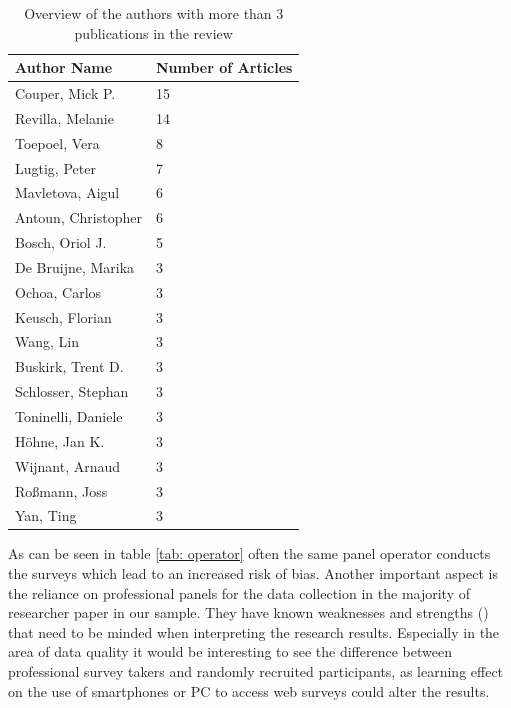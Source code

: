 \begin{table}
	\centering
	\begin{tabular}{ll}
		\toprule
		Author Name & Number of Articles \\
		\midrule
		Couper, Mick P. &        15 \\
        Revilla, Melanie &      14\\
        Toepoel, Vera  &         8\\
        Lugtig, Peter   &        7\\
        Mavletova, Aigul    &    6\\
        Antoun, Christopher  &   6\\
        Bosch, Oriol J.   &      5\\
        De Bruijne, Marika  &    3\\
        Ochoa, Carlos      &     3\\
        Keusch, Florian     &    3\\
        Wang, Lin           &    3\\
        Buskirk, Trent D.     &  3\\
        Schlosser, Stephan  &   3\\
        Toninelli, Daniele   &   3\\
        Höhne, Jan K.        &   3\\
        Wijnant, Arnaud      &   3\\
        Roßmann, Joss       &    3\\
        Yan, Ting            &   3\\
		\bottomrule 
	\end{tabular}
	\caption{Overview of the authors with more than 3 publications in the review}
	\label{tab: authors}
\end{table}

As can be seen in table \ref{tab: operator} often the same panel operator conducts the surveys which lead to an increased risk of bias. Another important aspect is the reliance on professional panels for the data collection in the majority of researcher paper in our sample. They have known weaknesses and strengths (\cite{callegaro_online_2014, kees_an_2017}) that need to be minded when interpreting the research results. Especially in the area of data quality it would be interesting to see the difference between professional survey takers and randomly recruited participants, as learning effect on the use of smartphones or PC to access web surveys could alter the results.

